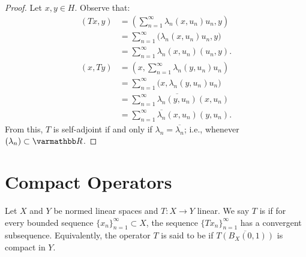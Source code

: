 \begin{proof}
    Let $x,y \in H$. Observe that:
        \begin{equation*}
        \begin{split}
            \left( Tx, y \right)
            & = \left( \sum_{n = 1}^\infty \lambda_n (x,u_n)u_n, y \right) \\
            & = \sum_{n = 1}^\infty \bigl(\lambda_n (x,u_n)u_n,y\bigr) \\
            & = \sum_{n = 1}^\infty \lambda_n (x,u_n)(u_n,y).
        \end{split}
        \end{equation*}
        \begin{equation*}
        \begin{split}
            (x,Ty)
            & = \left( x,\sum_{n = 1}^\infty \lambda_n (y,u_n)u_n \right) \\
            & = \sum_{n = 1}^\infty \bigl(x, \lambda_n (y,u_n)u_n\bigr) \\
            & = \sum_{n = 1}^\infty \overline{\lambda_n (y,u_n)}(x,u_n) \\
            & = \sum_{n = 1}^\infty \overline{\lambda_n}(x,u_n)(y,u_n).
        \end{split}
        \end{equation*}
    From this, $T$ is self-adjoint if and only if $\lambda_n = \overline{\lambda_n}$; i.e., whenever $(\lambda_n) \subset \bfR$.
\end{proof}

\section{Compact Operators}

\begin{definition}
    Let $X$ and $Y$ be normed linear spaces and $T:X \rightarrow Y$ linear. We say $T$ is  if for every bounded sequence $\{x_n\}_{n = 1}^\infty \subset X$, the sequence $\{T x_n\}_{n = 1}^\infty$ has a convergent subsequence. Equivalently, the operator $T$ is said to be  if $\overline{T(B_X(0,1))}$ is compact in $Y$.
\end{definition}

